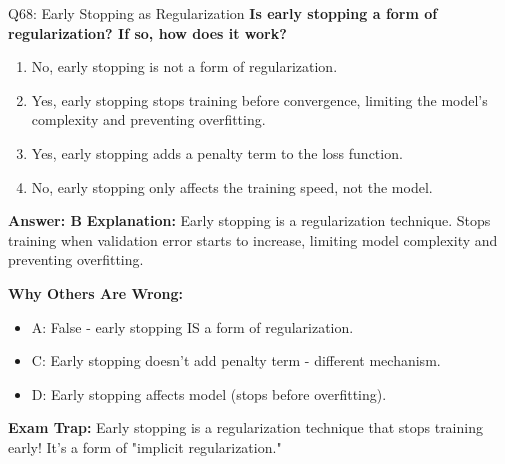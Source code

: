 \documentclass[8pt]{beamer}
\begin{document}
	\begin{frame}{Q68: Early Stopping as Regularization}
		\fontsize{6.5}{7.5}\selectfont
		\textbf{Is early stopping a form of regularization? If so, how does it work?}
		
		\begin{enumerate}
			\item No, early stopping is not a form of regularization.
			\item Yes, early stopping stops training before convergence, limiting the model's complexity and preventing overfitting.
			\item Yes, early stopping adds a penalty term to the loss function.
			\item No, early stopping only affects the training speed, not the model.
		\end{enumerate}
		
		\vspace{0.05cm}
		\textcolor{myblue}{\textbf{Answer: B}}
		\vspace{0.05cm}
		\textcolor{myblue}{\textbf{Explanation:}} Early stopping is a regularization technique. Stops training when validation error starts to increase, limiting model complexity and preventing overfitting.
		
		\vspace{0.05cm}
		\textcolor{myred}{\textbf{Why Others Are Wrong:}}
		\begin{itemize}
			\item \textcolor{myred}{A:} False - early stopping IS a form of regularization.
			\item \textcolor{myred}{C:} Early stopping doesn't add penalty term - different mechanism.
			\item \textcolor{myred}{D:} Early stopping affects model (stops before overfitting).
		\end{itemize}
		
		\textcolor{myred}{\textbf{Exam Trap:}} Early stopping is a \textcolor{myblue}{regularization technique} that stops training early! It's a form of "implicit regularization."
	\end{frame}
	
\end{document}
